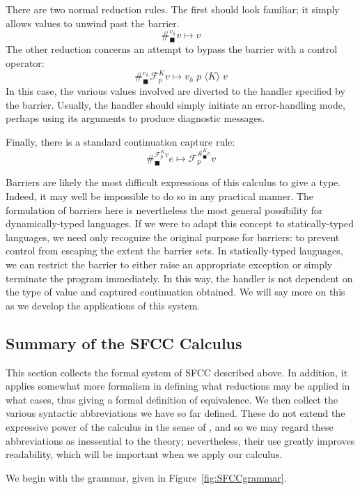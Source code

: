 \documentclass[11pt]{article}
\newcommand{\maybePage}{\newpage}
\newcommand\F{\mathcal{F}}
\newcommand{\angles}[1]{\langle#1\rangle}
\begin{document}
There are two normal reduction rules.
The first should look familiar; it simply allows values to unwind past the barrier.
$$\#_\blacksquare^{v_h}v \mapsto v$$
The other reduction concerns an attempt to bypass the barrier with a control operator:
$$\#_\blacksquare^{v_h}\F_p^K v \mapsto v_h\;p\;\angles{K}\;v$$
In this case, the various values involved are diverted to the handler specified by the barrier.
Usually, the handler should simply initiate an error-handling mode, perhaps using its arguments to produce diagnostic messages.

Finally, there is a standard continuation capture rule:
$$\#_\blacksquare^{\F_p^K v}e \mapsto \F_p^{\#_\blacksquare^K e}v$$

Barriers are likely the most difficult expressions of this calculus to give a type.
Indeed, it may well be impossible to do so in any practical manner.
The formulation of barriers here is nevertheless the most general possibility for dynamically-typed languages.
If we were to adapt this concept to statically-typed languages, we need only recognize the original purpose for barriers: to prevent control from escaping the extent the barrier sets.
In statically-typed languages, we can restrict the barrier to either raise an appropriate exception or simply terminate the program immediately.
In this way, the handler is not dependent on the type of value and captured continuation obtained.
We will say more on this as we develop the applications of this system.

\maybePage
\subsection{Summary of the SFCC Calculus}

This section collects the formal system of SFCC described above.
In addition, it applies somewhat more formalism in defining what reductions may be applied in what cases, thus giving a formal definition of equivalence.
We then collect the various syntactic abbreviations we have so far defined.
These do not extend the expressive power of the calculus in the sense of \cite{Felleisen90expressive}, and so we may regard these abbreviations as inessential to the theory;
nevertheless, their use greatly improves readability, which will be important when we apply our calculus.

We begin with the grammar, given in Figure~\ref{fig:SFCCgrammar}.
\end{document}
